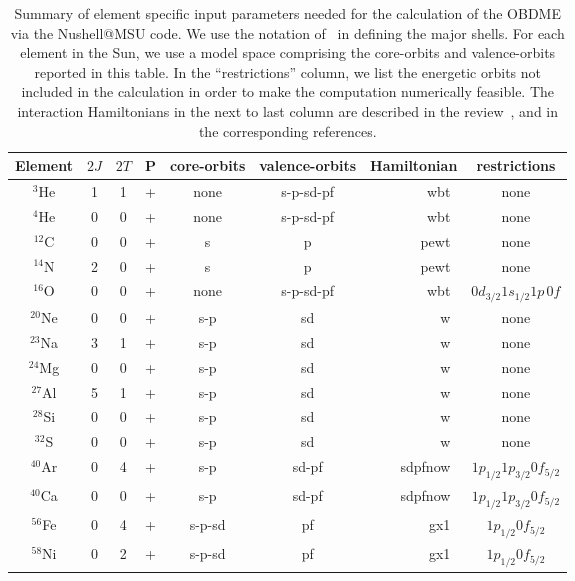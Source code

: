 \documentclass[11pt,a4paper]{article}
\begin{document}
\begin{table}
  \centering
  \begin{tabular}[!h]{|c|c|c|c|c|c|r|c|}
\hline
    Element&$2J$&$2T$&P&core-orbits&valence-orbits&Hamiltonian&restrictions\\
\hline
\hline
${}^{3}$He&1&1&+&none&s-p-sd-pf&wbt~\cite{Warburton:1992rh}&none\\
\hline
${}^{4}$He&0&0&+&none&s-p-sd-pf&wbt~\cite{Warburton:1992rh}&none\\
\hline
${}^{12}$C&0&0&+&s&p&pewt~\cite{Warburton:1992rh}&none\\
\hline
${}^{14}$N&2&0&+&s&p&pewt~\cite{Warburton:1992rh}&none\\
\hline
${}^{16}$O&0&0&+&none&s-p-sd-pf&wbt~\cite{Warburton:1992rh}&$0d_{3/2}1s_{1/2}1p\,0f$\\
\hline
${}^{20}$Ne&0&0&+&s-p&sd&w~\cite{Wildenthal:1984mf}&none\\
\hline
${}^{23}$Na&3&1&+&s-p&sd&w~\cite{Wildenthal:1984mf}&none\\
\hline
${}^{24}$Mg&0&0&+&s-p&sd&w~\cite{Wildenthal:1984mf}&none\\
\hline
${}^{27}$Al&5&1&+&s-p&sd&w~\cite{Wildenthal:1984mf}&none\\
\hline
${}^{28}$Si&0&0&+&s-p&sd&w~\cite{Wildenthal:1984mf}&none\\
\hline
${}^{32}$S&0&0&+&s-p&sd&w~\cite{Wildenthal:1984mf}&none\\
\hline
${}^{40}$Ar&0&4&+&s-p&sd-pf&sdpfnow~\cite{Nummela:2001xh}&$1p_{1/2}1p_{3/2}0f_{5/2}$\\
\hline
${}^{40}$Ca&0&0&+&s-p&sd-pf&sdpfnow~\cite{Nummela:2001xh}&$1p_{1/2}1p_{3/2}0f_{5/2}$\\
\hline
${}^{56}$Fe&0&4&+&s-p-sd&pf&gx1~\cite{Honma:2004xk}&$1p_{1/2}0f_{5/2}$\\
\hline
${}^{58}$Ni&0&2&+&s-p-sd&pf&gx1~\cite{Honma:2004xk}&$1p_{1/2}0f_{5/2}$\\
\hline
  \end{tabular}
  \caption{Summary of element specific input parameters needed for the calculation of the OBDME via the {\sffamily Nushell@MSU} code. We use the notation of~\cite{Brown:2001zz} in defining the major shells. For each element in the Sun, we use a model space comprising the core-orbits and valence-orbits reported in this table. In the ``restrictions'' column, we list the energetic orbits not included in the calculation in order to make the computation numerically feasible. The interaction Hamiltonians in the next to last column are described in the review~\cite{Brown:2001zz}, and in the corresponding references.}
\label{tab:inputs}
\end{table}
\end{document}
